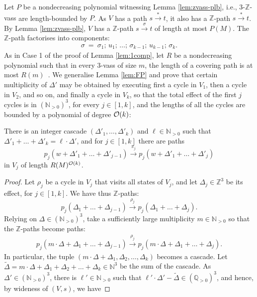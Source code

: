 \documentclass[a4paper, UKenglish, cleveref, autoref, thm-restate]{lipics-v2021}
\newcommand{\N}{\mathbb{N}}
\newcommand{\Z}{\mathbb{Z}}
\newcommand{\Q}{\mathbb{Q}}
\newcommand{\Qpos}{\Q_{>0}}
\newcommand{\trans}[1]{\stackrel{#1}{\longrightarrow}}
\newcommand{\tran}{\trans{*}}
\newcommand{\lb}{length-bounded\xspace}
\newcommand{\OO}{{\cal O}}
\newcommand{\vass}{{\sc vass}\xspace}
\newcommand{\tvass}{\parvass 3}
\newcommand{\tzvass}{\parzvass 3}
\newcommand{\parvass}[1]{{$#1$-\vass}\xspace}
\newcommand{\parzvass}[1]{{$#1$-$\Z$-\vass}\xspace}
\newcommand{\setfromto}[2]{[#1, #2]}
\newcommand{\setto}[1]{\setfromto 1 {#1}}
\newcommand{\Npos}{\N_{>0}}
\begin{document}
\begin{appendixproof}
Let $P$ be a nondecreasing polynomial witnessing Lemma \ref{lem:zvass-plb}, i.e.,
\tzvass are \lb by $P$.
As $V$ has a path $s \tran t$, it also has a $\Z$-path $s\tran t$.
By Lemma \ref{lem:zvass-plb}, $V$ has a $\Z$-path $s \trans{\sigma} t$ of length at most $P(M)$.
The $\Z$-path factorises into components:
\begin{align} \label{eq:Zpath}
\sigma \ = \ 
\sigma_1;\, u_1; \, \ldots; \, \sigma_{k-1}; \, u_{k-1}; \, \sigma_k.
\end{align}
As in Case 1 of the proof of Lemma \ref{lem:1comp},
let $R$ be a nondecreasing polynomial  such that in every \tvass of size $m$, the length of a covering
path is at most $R(m)$~\cite[Lemma~3.4]{DBLP:journals/tcs/Rackoff78}.
We generalise Lemma \ref{lem:FP} and prove that certain multiplicity of $\Delta'$
may be obtained by executing first a cycle in $V_1$, then a cycle in $V_2$, and so on,
and finally a cycle in $V_k$, so that the total effect of the first $j$ cycles is in $(\Npos)^3$,
for every $j\in\setto k$,
and the lengths of all the cycles are bounded by a polynomial of degree $\OO(k)$:
\begin{lemma} \label{lem:FPgen}
There is an integer cascade $(\Delta'_1, \ldots, \Delta'_k)$ and $\ell\in\Npos$ such that
$\Delta'_1 + \ldots + \Delta'_k = \ell\cdot\Delta'$, 
and for $j\in\setto k$ there are paths
\[
p_j(w+\Delta'_1 + \ldots + \Delta'_{j-1}) \trans {\pi_j}  p_j(w+ \Delta'_1 + \ldots + \Delta'_{j})
\]
in $V_j$
of length $R(M)^{\OO(k)}$.
\end{lemma}
\begin{proof} Let $\rho_j$ be a cycle in $V_j$ that visits all states of $V_j$, and
let $\Delta_j\in\Z^3$ be its effect, for $j\in\setto k$.
We have thus $\Z$-paths:
\[
p_j(\Delta_1 + \ldots + \Delta_{j-1}) \trans{\rho_j} p_j(\Delta_1 + \ldots + \Delta_j).
\]
Relying on $\Delta\in(\Npos)^3$,
take a sufficiently large multiplicity $m\in\Npos$ so that 
the $\Z$-paths become paths:
\begin{align} \label{eq:mDe}
p_j(m\cdot \Delta + \Delta_1 + \ldots + \Delta_{j-1}) \trans{\rho_j} p_j(m\cdot \Delta + \Delta_1 + \ldots + \Delta_j).
\end{align}
In particular, the tuple
$(m\cdot\Delta + \Delta_1, \Delta_2, \ldots, \Delta_k)$ becomes a cascade.
Let 
$\widetilde \Delta = m\cdot\Delta + \Delta_1 + \Delta_2 + \ldots + \Delta_k \in \N^3$
be the sum of the cascade.
As $\Delta'\in(\Npos)^3$, there is $\ell'\in\Npos$ such that 
$\ell'\cdot\Delta'-\widetilde \Delta \in (\Qpos)^3$,
and hence, by wideness of $(V, s)$, we have

\end{proof}
\end{appendixproof}
\end{document}
